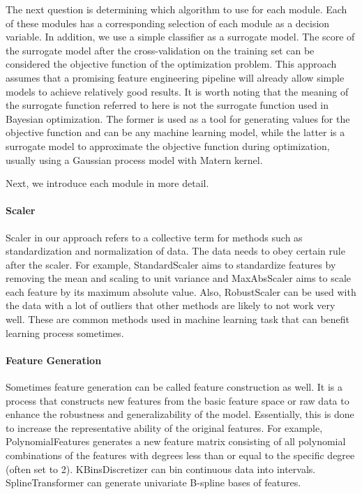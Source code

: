 \documentclass[review]{elsarticle}
\begin{document}
The next question is determining which algorithm to use for each module. Each of these modules has a corresponding selection of each module as a decision variable. In addition, we use a simple classifier as a surrogate model. The score of the surrogate model after the cross-validation on the training set can be considered the objective function of the optimization problem. This approach assumes that a promising feature engineering pipeline will already allow simple models to achieve relatively good results. It is worth noting that the meaning of the surrogate function referred to here is not the surrogate function used in Bayesian optimization. The former is used as a tool for generating values for the objective function and can be any machine learning model, while the latter is a surrogate model to approximate the objective function during optimization, usually using a Gaussian process model with Matern kernel.

Next, we introduce each module in more detail.
\paragraph{Scaler}
Scaler in our approach refers to a collective term for methods such as standardization and normalization of data. The data needs to obey certain rule after the scaler. For example, StandardScaler aims to standardize features by removing the mean and scaling to unit variance and MaxAbsScaler aims to scale each feature by its maximum absolute value. Also, RobustScaler can be used with the data with a lot of outliers that other methods are likely to not work very well. These are common methods used in machine learning task that can benefit learning process sometimes.
\paragraph{Feature Generation}
Sometimes feature generation can be called feature construction as well. It is a process that constructs new features from the basic feature space or raw data to enhance the robustness and generalizability of the model. Essentially, this is done to increase the representative ability of the original features\cite{he2021automl}. For example, PolynomialFeatures generates a new feature matrix consisting of all polynomial combinations of the features with degrees less than or equal to the specific degree (often set to 2). KBinsDiscretizer can bin continuous data into intervals. SplineTransformer can generate univariate B-spline bases of features\cite{perperoglou2019review}.
\end{document}
